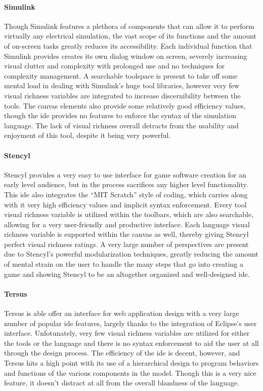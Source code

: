 \paragraph{Simulink} Though Simulink features a plethora of components that
can allow it to perform virtually any electrical simulation, the vast scope
of its functions and the amount of on-screen tasks greatly reduces its
accessibility. Each individual function that Simulink provides creates its
own dialog window on screen, severely increasing visual clutter and
complexity with prolonged use and no techniques for complexity management.
A searchable toolspace is present to take off some mental load in dealing
with Simulink's huge tool libraries, however very few visual richness
variables are integrated to increase discernibility between the tools. The
canvas elements also provide some relatively good efficiency values, though
the \ac{ide} provides no features to enforce the syntax of the simulation
language. The lack of visual richness overall detracts from the usability
and enjoyment of this tool, despite it being very powerful.

\paragraph{Stencyl} Stencyl provides a very easy to use interface for game
software creation for an early level audience, but in the process
sacrifices any higher level functionality. This \ac{ide} also integrates
the ``MIT Scratch'' style of coding, which carries along with it very high
efficiency values and implicit syntax enforcement. Every tool visual
richness variable is utilized within the toolbars, which are also
searchable, allowing for a very user-friendly and productive interface.
Each language visual richness variable is supported within the canvas as
well, thereby giving Stencyl perfect visual richness ratings. A very large
number of perspectives are present due to Stencyl's powerful modularization
techniques, greatly reducing the amount of mental strain on the user to
handle the many steps that go into creating a game and showing Stencyl to
be an altogether organized and well-designed \ac{ide}.

\paragraph{Tersus} Tersus is able offer an interface for web application design with a very large number of popular \ac{ide} features, largely thanks to the integration of Eclipse's user interface. Unfotunately, very few visual richness variables are utilized for either the tools or the language and there is no syntax enforcement to aid the user at all through the design process. The efficiency of the \ac{ide} is decent, however, and Tersus hits a high point with its use of a hierarchical design to program behaviors and functions of the various components in the model. Though this is a very nice feature, it doesn't distract at all from the overall blandness of the language.

